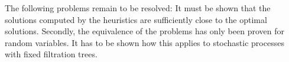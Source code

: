 The following problems remain to be resolved: It must be shown that the solutions computed by the heuristics are sufficiently close to the optimal solutions.
Secondly, the equivalence of the problems has only been proven for random variables.
It has to be shown how this applies to stochastic processes with fixed filtration trees.
\begin{comment}
In this section, we analyze the computation of the Kantorovich distance for a different setup.
Consider again two discrete stochastic processes $I$ and $J$ over time stages $T$ with values $\xi_i^t,\,i\in I$ and $\nu_j,\, j\in J,\;t\in T$.
Here, the values $\xi_i^t$ and their probabilities $p_i$ for process $I$ are fixed, while the values $\nu_j^t$ and probabilities $q_j$ for process $J$ are to be selected such that the Kantorovich Distance $D_K(I,J)$ is minimal.
The problem can be expressed as the NLP
\begin{align}
  \min\limits_{\eta,q,\nu}&\sum_{i\in I}\sum_{j\in J}\eta_{ij}c(\xi_i,\nu_j)\\
  \text{s.t.}&\sum_{i\in I}\eta_{ij} = q_j\\
  &\sum_{j\in J}\eta_{ij} = p_i\\
  &\eta_{ij}\geq 0\\
  &q\geq 0
\end{align}
As shown above in theorem \ref{thm:optimal-weights}, for any given set of $\nu_j^t$ the variables $\eta_{ij}$ and $q$ will take on the values
\begin{align}
  \eta_{ij} &= \left\{\begin{array}{lr}p_i&\text{if }j=\underset{j\in J}{\operatorname{argmin}}\, c(\xi_i,\nu_j)\\0&\text{otherwise}\end{array}\right. ,\\
  q_j &= \sum_{i\in I_j}p_i\text{ with } I_j= \left\{i\in I|j=\underset{k\in J}{\operatorname{argmin}}\, c(\xi_i,\nu_j)\right\}.
\end{align}
This corresponds to a \textit{set partitioning} of the set $I$ into $|J|$ parts, defined by a mapping
\[P:I\rightarrow J,\; i\mapsto \underset{j\in J}{\operatorname{argmin}}\, c(\xi_i, \nu_j)\]
Given the distances $c(\xi_i,\nu_j)$, the optimal partitioning of $I$ can be computed using theorem \ref{thm:optimal-weights} and algorithm \ref{alg:optimal-weights}.


\end{comment}
